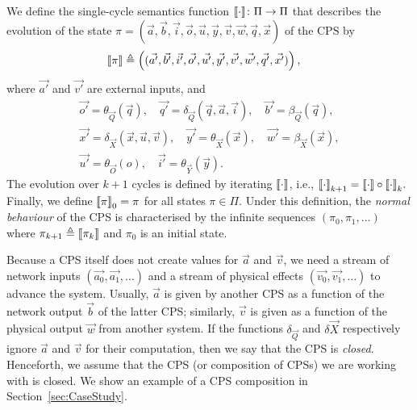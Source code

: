 {\begin{definition}
We define the single-cycle semantics function ${{{\llbracket\cdot\rrbracket}}}\colon \Pi \rightarrow \Pi$ that describes the evolution of the state $\pi=(\vec{a},\vec{b},\vec{i},\vec{o},\vec{u},\vec{y},\vec{v},\vec{w},\vec{q},\vec{x})$ of the CPS by
\begin{align}
{{\llbracket\pi\rrbracket}}&\triangleq\left((\vec{a'},\vec{b'},\vec{i'},\vec{o'},\vec{u'},\vec{y'},\vec{v'},\vec{w'},\vec{q'},\vec{x'})\right), 
\end{align}
where $\vec{a'}$ and $\vec{v'}$ are external inputs, and 
\begin{gather*}
\vec{o'}=\theta_{\vec{Q}}(\vec{q}),\quad 
\vec{q'}=\delta_{\vec{Q}}(\vec{q},\vec{a},\vec{i}),\quad 
\vec{b'}=\beta_{\vec{Q}}(\vec{q}),\\
\vec{x'}=\delta_{\vec{X}}(\vec{x},\vec{u},\vec{v}),\quad
\vec{y'}=\theta_{\vec{X}}(\vec{x}),\quad 
\vec{w'}=\beta_{\vec{X}}(\vec{x}),\\
\vec{u'}= \theta_{\vec{O}}(o),\quad\vec{i'}=\theta_{\vec{Y}}(\vec{y}).
\end{gather*}
The evolution over $k+1$ cycles is defined by iterating ${{{\llbracket\cdot\rrbracket}}}$, {i.e.}, 
${{{\llbracket\cdot\rrbracket}}}_{k+1}= {{{\llbracket\cdot\rrbracket}}} \circ {{{\llbracket\cdot\rrbracket}}}_{k}.$
Finally, we define ${{\llbracket\pi\rrbracket}}_{0}=\pi$ for all states $\pi \in \Pi$. Under this definition, the \emph{normal behaviour} of the CPS is characterised by the infinite sequences $(\pi_0, \pi_1, \ldots)$ where $\pi_{k+1}\triangleq{{\llbracket\pi_k\rrbracket}}$ and $\pi_0$ is an initial state.%
\end{definition}
}
Because a CPS itself does not create values for $\vec{a}$ and $\vec{v}$, we need a stream of network inputs $(\vec{a_0}, \vec{a_1}, \ldots)$ and a stream of physical effects $(\vec{v_0}, \vec{v_1}, \ldots)$ to advance the system. Usually, $\vec{a}$ is given by another CPS as a function of the network output $\vec{b}$ of the latter CPS; similarly, $\vec{v}$ is given as a function of the physical output $\vec{w}$ from another system. If the functions $\delta_{\vec{Q}}$ and $\delta{\vec{X}}$ respectively ignore $\vec{a}$ and $\vec{v}$ for their computation, then we say that the CPS is \emph{closed}.
Henceforth, we assume that the CPS (or composition of CPSs) we are working with is closed. We show an example of a CPS composition in Section~\ref{sec:CaseStudy}.


